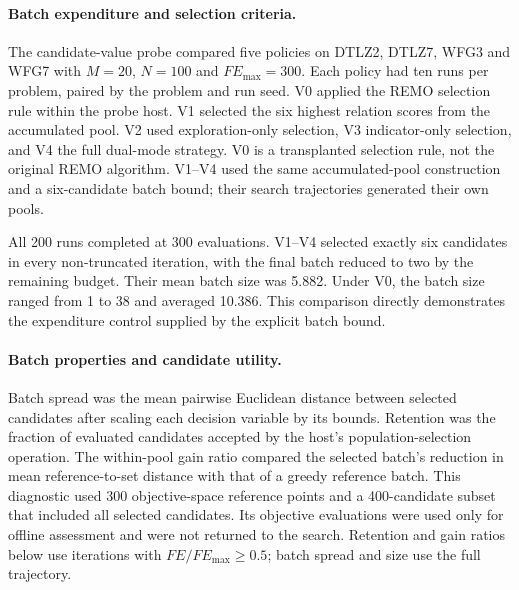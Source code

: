 \documentclass[final,5p,times,twocolumn]{elsarticle}
\begin{document}
\paragraph{Batch expenditure and selection criteria.}
The candidate-value probe compared five policies on DTLZ2, DTLZ7, WFG3
and WFG7 with $M=20$, $N=100$ and $FE_{\max}=300$. Each policy had ten
runs per problem, paired by the problem and run seed. V0 applied the
REMO selection rule within the probe host. V1 selected the six highest
relation scores from the accumulated pool. V2 used exploration-only
selection, V3 indicator-only selection, and V4 the full dual-mode
strategy. V0 is a transplanted selection rule, not the original REMO
algorithm. V1--V4 used the same accumulated-pool construction and a
six-candidate batch bound; their search trajectories generated their
own pools.

All 200 runs completed at 300 evaluations. V1--V4 selected exactly six
candidates in every non-truncated iteration, with the final batch
reduced to two by the remaining budget. Their mean batch size was
5.882. Under V0, the batch size ranged from 1 to 38 and averaged 10.386.
This comparison directly demonstrates the expenditure control supplied
by the explicit batch bound.

\paragraph{Batch properties and candidate utility.}
Batch spread was the mean pairwise Euclidean distance between selected
candidates after scaling each decision variable by its bounds. Retention was the fraction of evaluated candidates accepted
by the host's population-selection operation. The within-pool gain
ratio compared the selected batch's reduction in mean reference-to-set
distance with that of a greedy reference batch. This diagnostic used
300 objective-space reference points and a 400-candidate subset that
included all selected candidates. Its objective evaluations were used
only for offline assessment and were not returned to the search.
Retention and gain ratios below use iterations with
$FE/FE_{\max}\geq0.5$; batch spread and size use the full trajectory.
\end{document}
